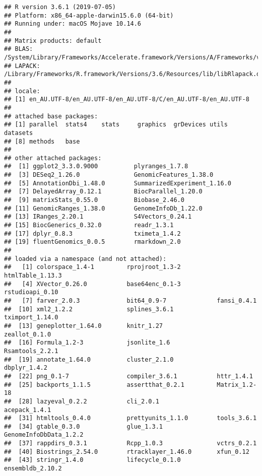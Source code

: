\documentclass[
]{article}
\begin{document}
\begin{verbatim}
## R version 3.6.1 (2019-07-05)
## Platform: x86_64-apple-darwin15.6.0 (64-bit)
## Running under: macOS Mojave 10.14.6
## 
## Matrix products: default
## BLAS:   /System/Library/Frameworks/Accelerate.framework/Versions/A/Frameworks/vecLib.framework/Versions/A/libBLAS.dylib
## LAPACK: /Library/Frameworks/R.framework/Versions/3.6/Resources/lib/libRlapack.dylib
## 
## locale:
## [1] en_AU.UTF-8/en_AU.UTF-8/en_AU.UTF-8/C/en_AU.UTF-8/en_AU.UTF-8
## 
## attached base packages:
## [1] parallel  stats4    stats     graphics  grDevices utils     datasets 
## [8] methods   base     
## 
## other attached packages:
##  [1] ggplot2_3.3.0.9000          plyranges_1.7.8            
##  [3] DESeq2_1.26.0               GenomicFeatures_1.38.0     
##  [5] AnnotationDbi_1.48.0        SummarizedExperiment_1.16.0
##  [7] DelayedArray_0.12.1         BiocParallel_1.20.0        
##  [9] matrixStats_0.55.0          Biobase_2.46.0             
## [11] GenomicRanges_1.38.0        GenomeInfoDb_1.22.0        
## [13] IRanges_2.20.1              S4Vectors_0.24.1           
## [15] BiocGenerics_0.32.0         readr_1.3.1                
## [17] dplyr_0.8.3                 tximeta_1.4.2              
## [19] fluentGenomics_0.0.5        rmarkdown_2.0              
## 
## loaded via a namespace (and not attached):
##   [1] colorspace_1.4-1         rprojroot_1.3-2          htmlTable_1.13.3        
##   [4] XVector_0.26.0           base64enc_0.1-3          rstudioapi_0.10         
##   [7] farver_2.0.3             bit64_0.9-7              fansi_0.4.1             
##  [10] xml2_1.2.2               splines_3.6.1            tximport_1.14.0         
##  [13] geneplotter_1.64.0       knitr_1.27               zeallot_0.1.0           
##  [16] Formula_1.2-3            jsonlite_1.6             Rsamtools_2.2.1         
##  [19] annotate_1.64.0          cluster_2.1.0            dbplyr_1.4.2            
##  [22] png_0.1-7                compiler_3.6.1           httr_1.4.1              
##  [25] backports_1.1.5          assertthat_0.2.1         Matrix_1.2-18           
##  [28] lazyeval_0.2.2           cli_2.0.1                acepack_1.4.1           
##  [31] htmltools_0.4.0          prettyunits_1.1.0        tools_3.6.1             
##  [34] gtable_0.3.0             glue_1.3.1               GenomeInfoDbData_1.2.2  
##  [37] rappdirs_0.3.1           Rcpp_1.0.3               vctrs_0.2.1             
##  [40] Biostrings_2.54.0        rtracklayer_1.46.0       xfun_0.12               
##  [43] stringr_1.4.0            lifecycle_0.1.0          ensembldb_2.10.2        

\end{verbatim}
\end{document}
